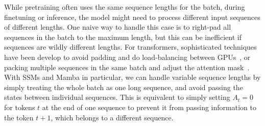 While pretraining often uses the same sequence lengths for the batch, during finetuning or inference, the model might need to process different input sequences of different lengths.
One naive way to handle this case is to right-pad all sequences in the batch to the maximum length, but this can be inefficient if sequences are wildly different lengths.
For transformers, sophisticated techniques have been develop to avoid padding and do load-balancing between GPUs~\citep{zeng2022boosting, zhai2023bytetransformer}, or packing multiple sequences in the same batch and adjust the attention mask~\citep{ding2024fewer, pouransari2024dataset}.
With SSMs and Mamba in particular, we can handle variable sequence lengths by simply treating the whole batch as one long sequence, and avoid passing the states between individual sequences.
This is equivalent to simply setting $A_t = 0$ for tokens $t$ at the end of one sequence to prevent it from passing information to the token $t + 1$, which belongs to a different sequence.
